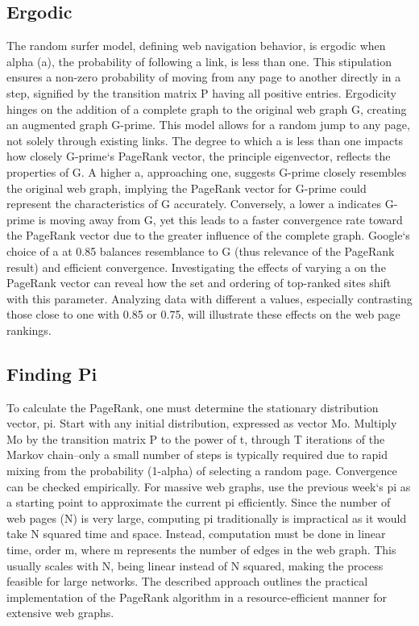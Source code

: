 \subsection*{Ergodic}
The random surfer model, defining web navigation behavior, is ergodic when alpha (a), the probability of following a link, is less than one.
This stipulation ensures a non-zero probability of moving from any page to another directly in a step, signified by the transition matrix P having all positive entries.
Ergodicity hinges on the addition of a complete graph to the original web graph G, creating an augmented graph G-prime.
This model allows for a random jump to any page, not solely through existing links.
The degree to which a is less than one impacts how closely G-prime`s PageRank vector, the principle eigenvector, reflects the properties of G\@.
A higher a, approaching one, suggests G-prime closely resembles the original web graph, implying the PageRank vector for G-prime could represent the characteristics of G accurately.
Conversely, a lower a indicates G-prime is moving away from G, yet this leads to a faster convergence rate toward the PageRank vector due to the greater influence of the complete graph.
Google`s choice of a at 0.85 balances resemblance to G (thus relevance of the PageRank result) and efficient convergence.
Investigating the effects of varying a on the PageRank vector can reveal how the set and ordering of top-ranked sites shift with this parameter.
Analyzing data with different a values, especially contrasting those close to one with 0.85 or 0.75, will illustrate these effects on the web page rankings.

\subsection*{Finding Pi}
To calculate the PageRank, one must determine the stationary distribution vector, pi.
Start with any initial distribution, expressed as vector Mo.
Multiply Mo by the transition matrix P to the power of t, through T iterations of the Markov chain--only a small number of steps is typically required due to rapid mixing from the probability (1-alpha) of selecting a random page.
Convergence can be checked empirically.
For massive web graphs, use the previous week`s pi as a starting point to approximate the current pi efficiently.
Since the number of web pages (N) is very large, computing pi traditionally is impractical as it would take N squared time and space.
Instead, computation must be done in linear time, order m, where m represents the number of edges in the web graph.
This usually scales with N, being linear instead of N squared, making the process feasible for large networks.
The described approach outlines the practical implementation of the PageRank algorithm in a resource-efficient manner for extensive web graphs.

